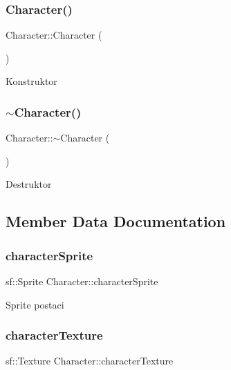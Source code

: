 \subsubsection{\texorpdfstring{Character()}{Character()}}
{\footnotesize\ttfamily Character\+::\+Character (\begin{DoxyParamCaption}{ }\end{DoxyParamCaption})}

Konstruktor \mbox{\label{class_character_a9e9be564d05ded80962b2045aa70b3fc}} 
\subsubsection{\texorpdfstring{$\sim$\+Character()}{~Character()}}
{\footnotesize\ttfamily Character\+::$\sim$\+Character (\begin{DoxyParamCaption}{ }\end{DoxyParamCaption})}

Destruktor 

\subsection{Member Data Documentation}
\mbox{\label{class_character_af726b53a176ba8032e3a0ad28a11868c}} 
\subsubsection{\texorpdfstring{character\+Sprite}{characterSprite}}
{\footnotesize\ttfamily sf\+::\+Sprite Character\+::character\+Sprite}

Sprite postaci \mbox{\label{class_character_a3880f38149ee17393273212aba865a5e}} 
\subsubsection{\texorpdfstring{character\+Texture}{characterTexture}}
{\footnotesize\ttfamily sf\+::\+Texture Character\+::character\+Texture}

